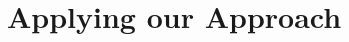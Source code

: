 \documentclass[12pt,oneside]{book}
\begin{document}




\part{Applying our Approach}
\label{part3}









\end{document}
